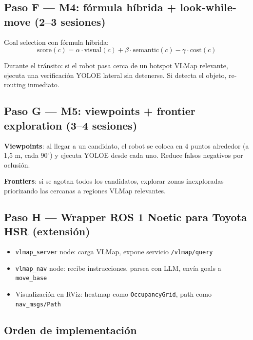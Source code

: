 \documentclass[11pt,a4paper]{article}
\begin{document}
\subsection{Paso F --- M4: fórmula híbrida + look-while-move (2--3 sesiones)}

Goal selection con fórmula híbrida:
\[
  \text{score}(c) = \alpha \cdot \text{visual}(c) + \beta \cdot \text{semantic}(c)
  - \gamma \cdot \text{cost}(c)
\]

Durante el tránsito: si el robot pasa cerca de un hotspot VLMap relevante, ejecuta
una verificación YOLOE lateral sin detenerse. Si detecta el objeto, re-routing inmediato.

\subsection{Paso G --- M5: viewpoints + frontier exploration (3--4 sesiones)}

\textbf{Viewpoints}: al llegar a un candidato, el robot se coloca en 4 puntos alrededor
(a 1,5 m, cada $90^\circ$) y ejecuta YOLOE desde cada uno. Reduce falsos negativos por oclusión.

\textbf{Frontiers}: si se agotan todos los candidatos, explorar zonas inexploradas
priorizando las cercanas a regiones VLMap relevantes.

\subsection{Paso H --- Wrapper ROS 1 Noetic para Toyota HSR (extensión)}

\begin{itemize}
  \item \texttt{vlmap\_server} node: carga VLMap, expone servicio \texttt{/vlmap/query}
  \item \texttt{vlmap\_nav} node: recibe instrucciones, parsea con LLM, envía goals
        a \texttt{move\_base}
  \item Visualización en RViz: heatmap como \texttt{OccupancyGrid},
        path como \texttt{nav\_msgs/Path}
\end{itemize}

\subsection{Orden de implementación}
\end{document}
